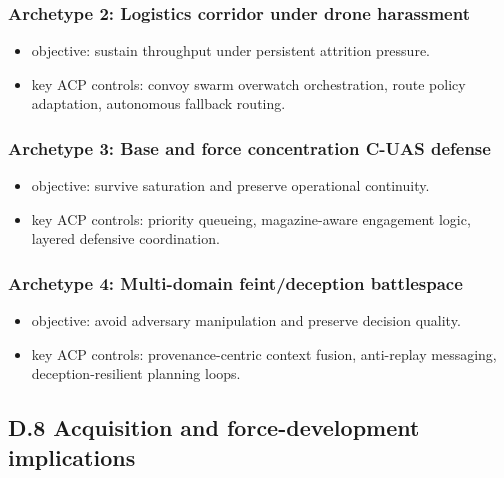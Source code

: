 \documentclass[
]{article}
\providecommand{\tightlist}{%
  \setlength{\itemsep}{0pt}\setlength{\parskip}{0pt}}
\begin{document}
\hypertarget{archetype-2-logistics-corridor-under-drone-harassment}{%
\subsubsection{Archetype 2: Logistics corridor under drone
harassment}\label{archetype-2-logistics-corridor-under-drone-harassment}}

\begin{itemize}
\tightlist
\item
  objective: sustain throughput under persistent attrition pressure.
\item
  key ACP controls: convoy swarm overwatch orchestration, route policy
  adaptation, autonomous fallback routing.
\end{itemize}

\hypertarget{archetype-3-base-and-force-concentration-c-uas-defense}{%
\subsubsection{Archetype 3: Base and force concentration C-UAS
defense}\label{archetype-3-base-and-force-concentration-c-uas-defense}}

\begin{itemize}
\tightlist
\item
  objective: survive saturation and preserve operational continuity.
\item
  key ACP controls: priority queueing, magazine-aware engagement logic,
  layered defensive coordination.
\end{itemize}

\hypertarget{archetype-4-multi-domain-feintdeception-battlespace}{%
\subsubsection{Archetype 4: Multi-domain feint/deception
battlespace}\label{archetype-4-multi-domain-feintdeception-battlespace}}

\begin{itemize}
\tightlist
\item
  objective: avoid adversary manipulation and preserve decision quality.
\item
  key ACP controls: provenance-centric context fusion, anti-replay
  messaging, deception-resilient planning loops.
\end{itemize}

\hypertarget{d.8-acquisition-and-force-development-implications}{%
\subsection{D.8 Acquisition and force-development
implications}\label{d.8-acquisition-and-force-development-implications}}
\end{document}
